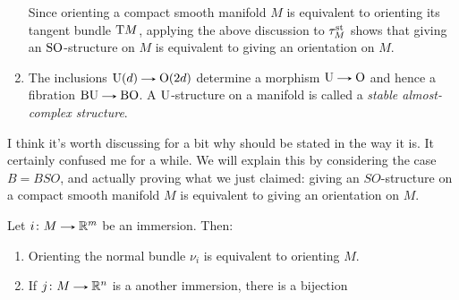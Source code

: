 \begin{examples}
\begin{enumerate}
    Since orienting a compact smooth manifold $M$ is equivalent to
    orienting its tangent bundle $\mathrm{T} M$, applying the above discussion
    to $\tau^{\mathrm{st}}_M$ shows that giving an $\mathrm{SO}$-structure on $M$ is
    equivalent to giving an orientation on $M$.
  \item The inclusions $\U(d) \to \O(2d)$ determine a morphism $\U \to
    \O$ and hence a fibration $\B\U \to \B\O$. A $\mathrm{U}$-structure on a
    manifold is called a \emph{stable almost-complex structure}.
  \end{enumerate}
\end{examples}

I think it's worth discussing for a bit why  should
be stated in the way it is. It certainly confused me for a while. We
will explain this by considering the case $B = BSO$, and actually
proving what we just claimed: giving an $SO$-structure on a compact
smooth manifold $M$ is equivalent to giving an orientation on $M$.

\begin{lemma} \label{normal-orientation}
  Let $i \c M \to \R^m$ be an immersion. Then:
  \begin{enumerate}
  \item Orienting the normal bundle $\nu_i$ is equivalent to orienting
    $M$.
  \item If $j \c M \to \R^n$ is a another immersion, there is a
    bijection
  \end{enumerate}
\end{lemma}

